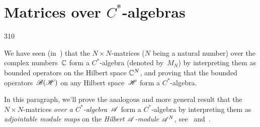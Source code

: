 \section{Matrices over $C^*$-algebras}
\begin{parsec}{310}%
\begin{point}{10}%
We have seen (in~) that the $N\times N$-matrices
($N$ being a natural number) over the complex numbers~$\mathbb{C}$
form a $C^*$-algebra (denoted by~$M_N$) by interpreting
them as bounded operators on the Hilbert space $\mathbb{C}^N$,
and proving
that the bounded operators~$\mathscr{B}(\mathscr{H})$
on any Hilbert space~$\mathscr{H}$ form a $C^*$-algebra.

In this paragraph, we'll prove the analogous
and more general
result that the 
$N\times N$-matrices \emph{over a $C^*$-algebra~$\mathscr{A}$}
form a $C^*$-algebra by interpreting them
as \emph{adjointable module maps} on
the \emph{Hilbert $\mathscr{A}$-module} $\mathscr{A}^N$,
see~ and~.
\end{point}
\end{parsec}
